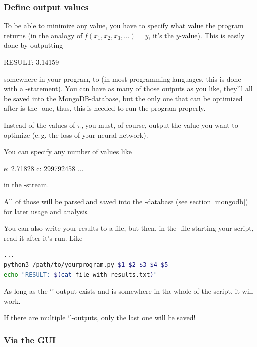 \documentclass[]{scrartcl}
\begin{document}
\subsubsection{Define output values}

To be able to minimize any value, you have to specify what value the program returns (in the
analogy of $f(x_1, x_2, x_3, \dots) = y$, it's the $y$-value). This is easily done by
outputting 

\begin{cverbatim}
RESULT: 3.14159
\end{cverbatim}

somewhere in your program, to  (in most programming languages, this is done with
a -statement). You can have as many of those outputs as you like, they'll all be saved
into the MongoDB-database, but the only one that can be optimized after is the -one,
thus, this is needed to run the program properly.

Instead of the values of $\pi$, you must, of course, output the
value you want to optimize (e.\,g. the loss of your neural network).

You can specify any number of values like

\begin{cverbatim}
e: 2.71828
c: 299792458
...
\end{cverbatim}

in the -stream.

All of those will be parsed and saved into the -database (see section \ref{mongodb}) for later usage
and analysis.

You can also write your results to a file, but then, in the -file starting your script, read it after
it's run. Like 

\begin{lstlisting}[language=bash]
...
python3 /path/to/yourprogram.py $1 $2 $3 $4 $5
echo "RESULT: $(cat file_with_results.txt)"
\end{lstlisting}

As long as the `'-output exists and is somewhere in the whole  of the script,
it will work.

If there are multiple `'-outputs, only the last one will be saved!

\subsubsection{Via the GUI}
\end{document}
